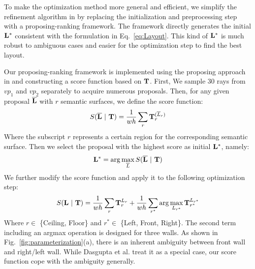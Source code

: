To make the optimization method more general and efficient, we simplify the refinement algorithm in \cite{dasgupta2016delay} by replacing the initialization and preprocessing step with a proposing-ranking framework. The  framework directly generates the initial $\mathbf{L^*}$ consistent with the formulation in Eq.~\ref{eq:Layout}. This kind of $\mathbf{L^*}$ is much robust to ambiguous cases and easier for the optimization step to find the best layout.

Our proposing-ranking framework is implemented using the proposing approach in \cite{hedau2009recovering} and constructing a score function based on $\mathbf{T}$. First, We sample 30 rays from $vp_1$ and $vp_2$ separately to acquire numerous proposals. Then, for any given proposal $\mathbf{\overline{L}}$ with $r$ semantic surfaces, we define the score function:
%
\begin{equation}
\label{eq:scorefunction}
S(\mathbf{\overline{L}}~|~\mathbf{T}) = \frac{1}{wh}\sum_r \mathbf{T}_r^{(\overline{L}_r)}
\end{equation}
%
Where the subscript $r$ represents a certain region for the corresponding semantic surface. Then we select the proposal with the highest score as initial $\mathbf{L^*}$, namely:
%
\begin{equation}
\label{eq:initial}
\mathbf{L^*} = \arg\max_{\overline{L}} S(\mathbf{\overline{L}}~|~\mathbf{T})
\end{equation}
%
We further modify the score function and apply it to the following optimization step:
%
\begin{equation}
\label{eq:optimize}
S(\mathbf{L}~|~\mathbf{T}) = \frac{1}{wh}\sum_{r} \mathbf{T}_{r}^{L_{r}} + \frac{1}{wh}\sum_{r^*} \arg\max_{L_{r^*}} \mathbf{T}_{r^*}^{L_{r^*}}
\end{equation}
%
Where $r \in$ \{Ceiling, Floor\} and $r^* \in$ \{Left, Front, Right\}. The second term including an argmax operation is designed for three walls. As shown in Fig.~\ref{fig:parameterization}(a), there is an inherent ambiguity between front wall and right/left wall. While Dasgupta et al. \cite{dasgupta2016delay} treat it as a special case, our score function cope with the ambiguity generally.

